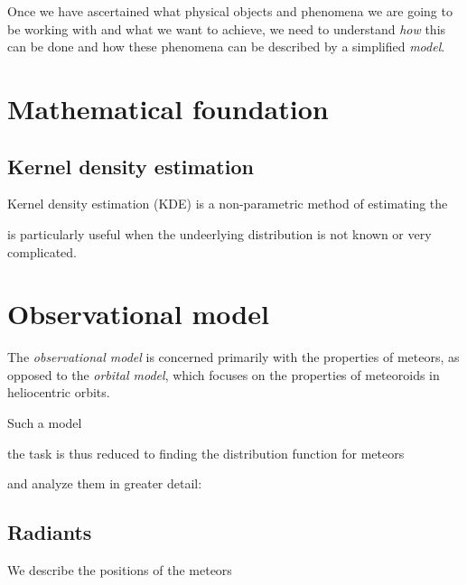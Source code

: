
Once we have ascertained what physical objects and phenomena we are going to be working with and what we want to achieve,
we need to understand \emph{how} this can be done and how these phenomena can be described by a simplified \emph{model}.

\section{Mathematical foundation} \label{mm}

    \subsection{Kernel density estimation}
        Kernel density estimation (KDE) is a non-parametric method of estimating the

        is particularly useful when the undeerlying distribution is not known or very complicated.

    \subsection{}

\section{Observational model} \label{ms}
    The \emph{observational model} is concerned primarily with the properties of meteors,
    as opposed to the \emph{orbital model}, which focuses on the properties of meteoroids in heliocentric orbits.

    Such a model 

    the task is thus reduced to finding the distribution function for meteors

    and analyze them in greater detail:


        \subsection{Radiants} \label{msr}
            We describe the positions of the meteors

